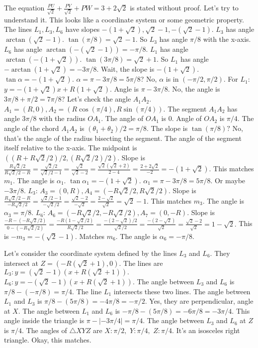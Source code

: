 The equation $\frac{PU}{\sqrt{2}} + \frac{PV}{\sqrt{2}} + PW = 3+2\sqrt2$ is stated without proof. Let's try to understand it. 
This looks like a coordinate system or some geometric property. 
The lines $L_1, L_3, L_6$ have slopes $-(1+\sqrt{2}), \sqrt{2}-1, -(\sqrt{2}-1).$ 
$L_3$ has angle $\arctan(\sqrt{2}-1).$ $\tan(\pi/8) = \sqrt{2}-1.$ So $L_3$ has angle $\pi/8$ with the x-axis. 
$L_6$ has angle $\arctan(-(\sqrt{2}-1)) = -\pi/8.$ 
$L_1$ has angle $\arctan(-(1+\sqrt{2})).$ $\tan(3\pi/8) = \sqrt{2}+1.$ So $L_1$ has angle $-\arctan(1+\sqrt{2}) = -3\pi/8.$ Wait, the slope is $-(1+\sqrt{2}).$ $\tan \alpha = -(1+\sqrt{2}).$ $\alpha = \pi - 3\pi/8 = 5\pi/8$? No, $\alpha$ is in $(-\pi/2, \pi/2).$ For $L_1$: $y = -(1+\sqrt{2})x + R(1+\sqrt{2}).$ Angle is $\pi - 3\pi/8.$ No, the angle is $3\pi/8 + \pi/2 = 7\pi/8$? Let's check the angle $A_1A_2.$ $A_1=(R,0), A_2=(R\cos(\pi/4), R\sin(\pi/4)).$ The segment $A_1A_2$ has angle $3\pi/8$ with the radius $OA_1.$ The angle of $OA_1$ is 0. Angle of $OA_2$ is $\pi/4.$ The angle of the chord $A_1A_2$ is $(\theta_1+\theta_2)/2 = \pi/8.$ The slope is $\tan(\pi/8)?$ No, that's the angle of the radius bisecting the segment. The angle of the segment itself relative to the x-axis. The midpoint is $( (R+R\sqrt{2}/2)/2, (R\sqrt{2}/2)/2 ).$ Slope is $\frac{R\sqrt{2}/2}{R\sqrt{2}/2 - R} = \frac{\sqrt{2}/2}{\sqrt{2}/2-1} = \frac{\sqrt{2}}{\sqrt{2}-2} = \frac{\sqrt{2}(\sqrt{2}+2)}{2-4} = \frac{2+2\sqrt{2}}{-2} = -(1+\sqrt{2}).$ This matches $m_1.$ The angle is $\alpha_1.$ $\tan \alpha_1 = -(1+\sqrt{2}).$ $\alpha_1 = \pi - 3\pi/8 = 5\pi/8.$ Or maybe $-3\pi/8.$ 
$L_3$: $A_3=(0,R), A_4=(-R\sqrt{2}/2, R\sqrt{2}/2).$ Slope is $\frac{R\sqrt{2}/2-R}{-R\sqrt{2}/2} = \frac{\sqrt{2}/2-1}{-\sqrt{2}/2} = \frac{\sqrt{2}-2}{-\sqrt{2}} = \frac{2-\sqrt{2}}{\sqrt{2}} = \sqrt{2}-1.$ This matches $m_3.$ The angle is $\alpha_3 = \pi/8.$ 
$L_6$: $A_6=(-R\sqrt{2}/2, -R\sqrt{2}/2), A_7=(0,-R).$ Slope is $\frac{-R - (-R\sqrt{2}/2)}{0 - (-R\sqrt{2}/2)} = \frac{-R(1-\sqrt{2}/2)}{R\sqrt{2}/2} = \frac{-(2-\sqrt{2})/2}{\sqrt{2}/2} = \frac{-(2-\sqrt{2})}{\sqrt{2}} = \frac{\sqrt{2}-2}{\sqrt{2}} = 1-\sqrt{2}.$ This is $-m_3 = -(\sqrt{2}-1).$ Matches $m_6.$ The angle is $\alpha_6 = -\pi/8.$

Let's consider the coordinate system defined by the lines $L_3$ and $L_6.$ They intersect at $Z=(-R(\sqrt{2}+1), 0).$ The lines are $L_3: y = (\sqrt{2}-1)(x+R(\sqrt{2}+1)).$ $L_6: y = -(\sqrt{2}-1)(x+R(\sqrt{2}+1)).$ 
The angle between $L_3$ and $L_6$ is $\pi/8 - (-\pi/8) = \pi/4.$ 
The line $L_1$ intersects these two lines. The angle between $L_1$ and $L_3$ is $\pi/8 - (5\pi/8) = -4\pi/8 = -\pi/2.$ Yes, they are perpendicular, angle at $X.$ 
The angle between $L_1$ and $L_6$ is $-\pi/8 - (5\pi/8) = -6\pi/8 = -3\pi/4.$ This angle inside the triangle is $\pi-|-3\pi/4|=\pi/4.$ 
The angle between $L_3$ and $L_6$ at $Z$ is $\pi/4.$ 
The angles of $\triangle XYZ$ are $X:\pi/2,$ $Y:\pi/4,$ $Z:\pi/4.$ It's an isosceles right triangle. Okay, this matches.


